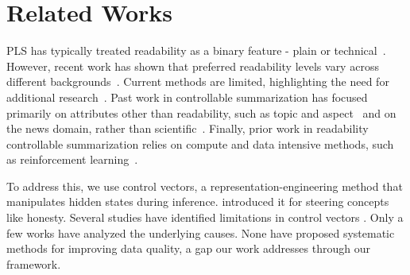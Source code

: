 \section{Related Works}
PLS has typically treated readability as a binary feature - plain or technical~\cite{Guo2020AutomatedLL,goldsack2022making,Zaman2020HTSSAN}. However, recent work has shown that preferred readability levels vary across different backgrounds~\cite{August2024KnowYA}. Current methods are limited, highlighting the need for additional research~\cite{luo2022readability}. 
Past work in controllable summarization has focused primarily on attributes other than readability, such as topic and aspect~\cite{urlana-etal-2024-controllable, Zhang2022MACSumCS, he2022ctrlsum} and on the news domain, rather than scientific~\cite{retkowski-waibel-2025-zero, Chan2021ControllableSW}. Finally, prior work in readability controllable summarization relies on compute and data intensive methods, such as reinforcement learning~\cite{ribeiro-etal-2023-generating}. 

To address this, we use control vectors, a representation-engineering method that manipulates hidden states during inference.  \textcite{zou2025representationengineeringtopdownapproach} introduced it for steering concepts like honesty. Several studies have identified limitations in control vectors \parencite{bartoszcze2025representationengineeringlargelanguagemodels, wehner2025taxonomyopportunitieschallengesrepresentation, vonrutte2024languagemodelsguidelatent, korznikov2025roguescalpelactivationsteering, stickland2024steeringeffectsimprovingpostdeployment}. Only a few works \parencite{10.5555/3737916.3742333, braun2025understandingunreliabilitysteeringvectors} have analyzed the underlying causes. None have proposed systematic methods for improving data quality, a gap our work addresses through our framework.


